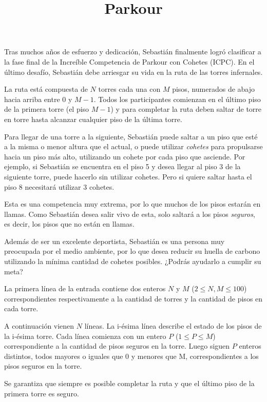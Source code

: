 \documentclass{oci}
\title{Parkour}
\begin{document}
\begin{problemDescription}
  Tras muchos años de esfuerzo y dedicación, Sebastián finalmente logró
  clasificar a la fase final de la Increíble Competencia de Parkour con
  Cohetes (ICPC).
  En el último desafío, Sebastián debe arriesgar
  su vida en la ruta de las torres infernales.

  La ruta está compuesta de $N$ torres cada una con
  $M$ pisos, numerados de abajo hacia arriba entre 0
  y $M-1$.
  Todos los participantes comienzan en el último piso de la primera
  torre (el piso $M-1$) y para completar la ruta deben saltar de torre
  en torre hasta alcanzar cualquier piso de la última torre.

  Para llegar de una torre a la siguiente, Sebastián puede saltar a un piso
  que esté a la misma o menor altura que el actual, o puede utilizar \emph{cohetes}
  para propulsarse hacia un piso más alto, utilizando un cohete por cada piso que asciende.
  Por ejemplo, si Sebastián se encuentra en el piso 5 y desea llegar
  al piso 3 de la siguiente torre, puede hacerlo sin utilizar cohetes.
  Pero si quiere saltar hasta el piso 8 necesitará utilizar 3 cohetes.

  Esta es una competencia muy extrema, por lo que muchos de los pisos
  estarán en llamas.
  Como Sebastián desea salir vivo de esta, solo saltará a los pisos
  \emph{seguros}, es decir, los pisos que no están en llamas.

  Además de ser un excelente deportista, Sebastián es una persona muy
  preocupada por el medio ambiente, por lo que desea reducir su huella
  de carbono utilizando la mínima cantidad de cohetes posibles.
  ¿Podrás ayudarlo a cumplir su meta?

\end{problemDescription}

\begin{inputDescription}
  La primera línea de la entrada contiene dos enteros $N$ y $M$ ($2 \leq N, M \leq 100$)
  correspondientes respectivamente a la cantidad de torres y la cantidad de pisos en cada torre.

  A continuación vienen $N$ líneas.
  La i-ésima línea describe el estado de los pisos de la i-ésima torre.
  Cada línea comienza con un entero $P$ ($1 \leq P \leq M$) correspondiente
  a la cantidad de pisos seguros en la torre.
  Luego siguen $P$ enteros distintos, todos mayores o iguales que $0$ y menores que M,
  correspondientes a los pisos seguros en la torre.

  Se garantiza que siempre es posible completar la ruta y que el
  último piso de la primera torre es seguro.
\end{inputDescription}
\end{document}
